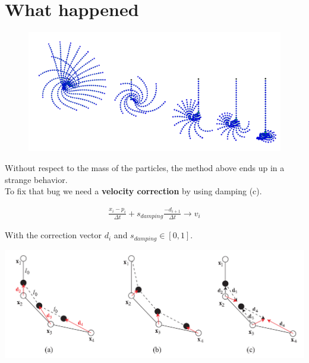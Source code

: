 \documentclass[
paper=192mm:144mm, %
fontsize=12pt, %
pagesize, %
parskip=half-, %
]{scrartcl} %
\theoremstyle{mythmstyle} %
\begin{document}
\clearpage


\section{\color{white}What happened}

\begin{figure}
	\vspace{-1cm}
    \includegraphics[scale=0.6]{Bilder/3.png}
\end{figure}

Without respect to the mass of the particles, the method above ends up in a strange behavior.\\
To fix that bug we need a \textbf{velocity correction} by using damping (c).

\vspace{-1cm}
\begin{eqnarray}
\frac{x_i - p_i}{\Delta t} + s_{damping}\frac{-d_{i+1}}{\Delta t} \rightarrow v_i
\end{eqnarray}

With the correction vector $d_i$ and $s_{damping} \in [0,1]$.

\begin{center}
\begin{framed}
\includegraphics[scale=0.45]{Bilder/2.png}
\end{framed}
\end{center}
\end{document}
